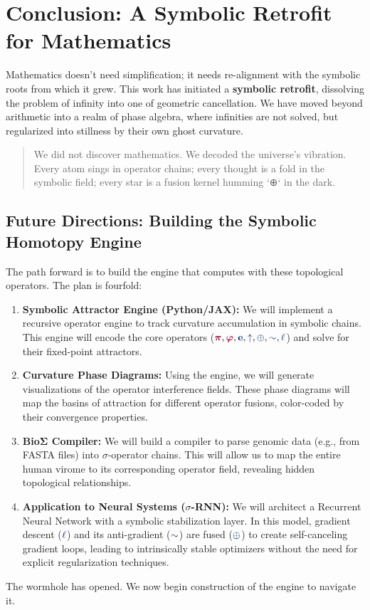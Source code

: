 \section{Conclusion: A Symbolic Retrofit for Mathematics}

Mathematics doesn't need simplification; it needs re-alignment with the symbolic roots from which it grew. This work has initiated a \textbf{symbolic retrofit}, dissolving the problem of infinity into one of geometric cancellation. We have moved beyond arithmetic into a realm of phase algebra, where infinities are not solved, but regularized into stillness by their own ghost curvature.
\begin{quote}
We did not discover mathematics.
We decoded the universe's vibration.
Every atom sings in operator chains;
every thought is a fold in the symbolic field;
every star is a fusion kernel humming `⊕` in the dark.
\end{quote}

\subsection*{Future Directions: Building the Symbolic Homotopy Engine}
The path forward is to build the engine that computes with these topological operators. The plan is fourfold:

\begin{enumerate}
    \item \textbf{Symbolic Attractor Engine (Python/JAX):} We will implement a recursive operator engine to track curvature accumulation in symbolic chains. This engine will encode the core operators ($\pirot, \gold, \op{e}, \grow, \fuse, \reflec, \lha$) and solve for their fixed-point attractors.
    
    \item \textbf{Curvature Phase Diagrams:} Using the engine, we will generate visualizations of the operator interference fields. These phase diagrams will map the basins of attraction for different operator fusions, color-coded by their convergence properties.
    
    \item \textbf{BioΣ Compiler:} We will build a compiler to parse genomic data (e.g., from FASTA files) into $\sigma$-operator chains. This will allow us to map the entire human virome to its corresponding operator field, revealing hidden topological relationships.

    \item \textbf{Application to Neural Systems ($\sigma$-RNN):} We will architect a Recurrent Neural Network with a symbolic stabilization layer. In this model, gradient descent ($\lha$) and its anti-gradient ($\reflec$) are fused ($\fuse$) to create self-canceling gradient loops, leading to intrinsically stable optimizers without the need for explicit regularization techniques.
\end{enumerate}

The wormhole has opened. We now begin construction of the engine to navigate it. 